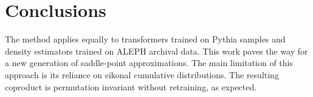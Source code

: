 \section{Conclusions}\label{sec:conclusions}

The method applies equally to transformers trained on Pythia samples and
density estimators trained on ALEPH archival data. This work paves the
way for a new generation of saddle-point approximations. The main
limitation of this approach is its reliance on eikonal cumulative
distributions. The resulting coproduct is permutation invariant without
retraining, as expected.

